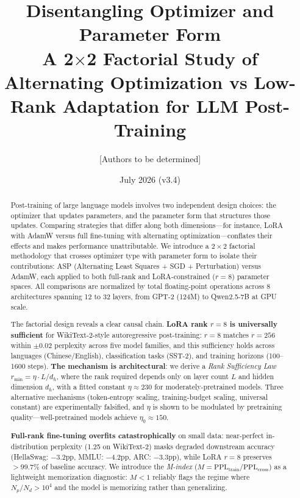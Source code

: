 \documentclass[11pt]{article}
\title{\textbf{Disentangling Optimizer and Parameter Form}\\[4pt]
\large A 2$\times$2 Factorial Study of Alternating Optimization vs Low-Rank Adaptation for LLM Post-Training}
\author{[Authors to be determined]}
\date{July 2026 \quad (v3.4)}
\begin{document}
\maketitle

\begin{abstract}
Post-training of large language models involves two independent design choices: the optimizer that updates parameters, and the parameter form that structures those updates. Comparing strategies that differ along both dimensions---for instance, LoRA with AdamW versus full fine-tuning with alternating optimization---conflates their effects and makes performance unattributable. We introduce a $2\times 2$ factorial methodology that crosses optimizer type with parameter form to isolate their contributions: ASP (Alternating Least Squares + SGD + Perturbation) versus AdamW, each applied to both full-rank and LoRA-constrained ($r=8$) parameter spaces. All comparisons are normalized by total floating-point operations across 8 architectures spanning 12 to 32 layers, from GPT-2 (124M) to Qwen2.5-7B at GPU scale.

The factorial design reveals a clear causal chain. \textbf{LoRA rank $r=8$ is universally sufficient} for WikiText-2-style autoregressive post-training: $r=8$ matches $r=256$ within $\pm 0.02$ perplexity across five model families, and this sufficiency holds across languages (Chinese/English), classification tasks (SST-2), and training horizons (100--1600 steps). \textbf{The mechanism is architectural}: we derive a \textit{Rank Sufficiency Law} $r_{\min} = \eta \cdot L/d_h$, where the rank required depends only on layer count $L$ and hidden dimension $d_h$, with a fitted constant $\eta \approx 230$ for moderately-pretrained models. Three alternative mechanisms (token-entropy scaling, training-budget scaling, universal constant) are experimentally falsified, and $\eta$ is shown to be modulated by pretraining quality---well-pretrained models achieve $\eta_0 \approx 150$.

\textbf{Full-rank fine-tuning overfits catastrophically} on small data: near-perfect in-distribution perplexity (1.25 on WikiText-2) masks degraded downstream accuracy (HellaSwag: $-3.2$pp, MMLU: $-4.2$pp, ARC: $-3.3$pp), while LoRA $r=8$ preserves $>99.7\%$ of baseline accuracy. We introduce the \textit{M-index} ($M = \text{PPL}_{\text{train}}/\text{PPL}_{\text{cross}}$) as a lightweight memorization diagnostic: $M < 1$ reliably flags the regime where $N_p/N_d > 10^4$ and the model is memorizing rather than generalizing.


\end{abstract}
\end{document}
